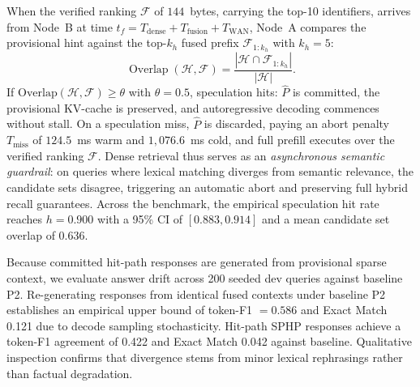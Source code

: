 \documentclass[conference,a4paper]{IEEEtran}
\newcommand{\Tdense}{T_{\mathrm{dense}}}
\newcommand{\Tfusion}{T_{\mathrm{fusion}}}
\newcommand{\Twan}{T_{\mathrm{WAN}}}
\newcommand{\Tmiss}{T_{\mathrm{miss}}}
\begin{document}
When the verified ranking $\mathcal{F}$ of $144$~bytes, carrying the top-10 identifiers, arrives from Node~B at time $t_f = \Tdense + \Tfusion + \Twan$, Node~A compares the provisional hint against the top-$k_h$ fused prefix $\mathcal{F}_{1:k_h}$ with $k_h = 5$:
\begin{equation}
    \operatorname{Overlap}(\mathcal{H}, \mathcal{F}) = \frac{|\mathcal{H} \cap \mathcal{F}_{1:k_h}|}{|\mathcal{H}|}.
\end{equation}
If $\text{Overlap}(\mathcal{H}, \mathcal{F}) \ge \theta$ with $\theta = 0.5$, speculation hits: $\hat{P}$ is committed, the provisional KV-cache is preserved, and autoregressive decoding commences without stall. On a speculation miss, $\hat{P}$ is discarded, paying an abort penalty $\Tmiss$ of $124.5$~ms warm and $1{,}076.6$~ms cold, and full prefill executes over the verified ranking $\mathcal{F}$. Dense retrieval thus serves as an \emph{asynchronous semantic guardrail}: on queries where lexical matching diverges from semantic relevance, the candidate sets disagree, triggering an automatic abort and preserving full hybrid recall guarantees. Across the benchmark, the empirical speculation hit rate reaches $h = 0.900$ with a 95\% CI of $[0.883, 0.914]$ and a mean candidate set overlap of 0.636.

Because committed hit-path responses are generated from provisional sparse context, we evaluate answer drift across 200 seeded dev queries against baseline P2. Re-generating responses from identical fused contexts under baseline P2 establishes an empirical upper bound of token-F1 $= 0.586$ and Exact Match 0.121 due to decode sampling stochasticity. Hit-path SPHP responses achieve a token-F1 agreement of 0.422 and Exact Match 0.042 against baseline. Qualitative inspection confirms that divergence stems from minor lexical rephrasings rather than factual degradation.
\end{document}

